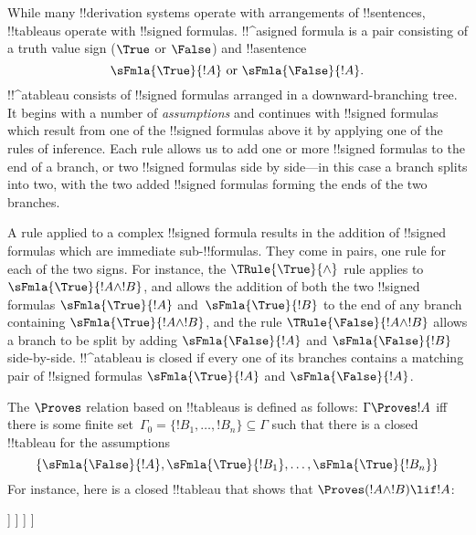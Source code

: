 \documentclass[../../../include/open-logic-section]{subfiles}
\begin{document}
      {}
      {}

While many !!{derivation} systems operate with arrangements of
!!{sentence}s, !!{tableau}s operate with !!{signed formula}s.
!!^a{signed formula} is a pair consisting of a truth value sign
($\True$ or $\False$) and !!a{sentence}
\[
\sFmla{\True}{!A} \text{ or } \sFmla{\False}{!A}.
\]
!!^a{tableau} consists of !!{signed formula}s arranged in a
downward-branching tree. It begins with a number of \emph{assumptions}
and continues with !!{signed formula}s which result from one of the
!!{signed formula}s above it by applying one of the rules of
inference. Each rule allows us to add one or more !!{signed formula}s
to the end of a branch, or two !!{signed formula}s side by side---in
this case a branch splits into two, with the two added !!{signed
  formula}s forming the ends of the two branches.

A rule applied to a complex !!{signed formula} results in the addition
of !!{signed formula}s which are immediate sub-!!{formula}s. They come
in pairs, one rule for each of the two signs.  For instance, the
$\TRule{\True}{\land}$ rule applies to $\sFmla{\True}{!A \land !B}$,
and allows the addition of both the two !!{signed formula}s
$\sFmla{\True}{!A}$ and~$\sFmla{\True}{!B}$ to the end of any branch
containing $\sFmla{\True}{!A \land !B}$, and the rule
$\TRule{\False}{!A \land !B}$ allows a branch to be split by adding
$\sFmla{\False}{!A}$ and $\sFmla{\False}{!B}$ side-by-side.
!!^a{tableau} is closed if every one of its branches contains a
matching pair of !!{signed formula}s $\sFmla{\True}{!A}$ and
$\sFmla{\False}{!A}$.

The $\Proves$ relation based on !!{tableau}s is defined as follows:
$\Gamma \Proves !A$ iff there is some finite set~$\Gamma_0 = \{!B_1,
\dots, !B_n\} \subseteq \Gamma$ such that there is a closed !!{tableau}
for the assumptions
\[
\{\sFmla{\False}{!A}, \sFmla{\True}{!B_1}, \dots, \sFmla{\True}{!B_n}\} 
\]
For instance, here is a closed !!{tableau} that shows that $\Proves
(!A \land !B) \lif !A$:
\begin{oltableau}
  [\sFmla{\False}{(\formula{A} \land \formula{B}) \lif \formula{A}}, just = \TAss
    [\sFmla{\True}{\formula{A} \land \formula{B}}, just = {\TRule{\False}{\lif}[1]}
      [\sFmla{\False}{\formula{A}}, just = {\TRule{\False}{\lif}[1]}
        [\sFmla{\True}{\formula{A}}, just = {\TRule{\True}{\lif}[2]}
          [\sFmla{\True}{\formula{B}}, just = {\TRule{\True}{\lif}[2]}, close]
        ]
      ]
    ]
  ]
\end{oltableau}
\end{document}
